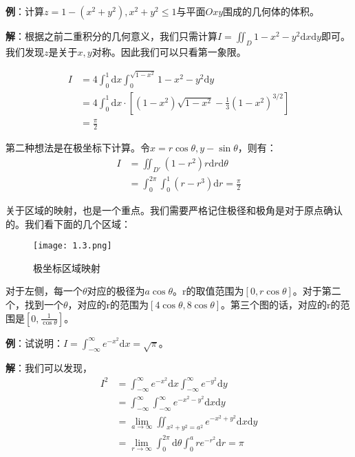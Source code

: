 \documentclass{ctexart}
\let\oldtextbf\textbf
\renewcommand{\textbf}[1]{\textcolor{brown!50!red}{\oldtextbf{#1}}}
\begin{document}
\textbf{\color{brown!50!red}例}：计算$z=1-(x^2+y^2),x^2+y^2\leq 1$与平面$Oxy$围成的几何体的体积。

\textbf{\color{brown!50!red}解}：根据之前二重积分的几何意义，我们只需计算$I=\iint_D 1-x^2-y^2 \mathrm{d}x\mathrm{d}y$即可。我们发现$z$是关于$x,y$对称。因此我们可以只看第一象限。

\begin{align*}
    I&=4\int_0^1\mathrm{d}x\int_0^{\sqrt{1-x^2}}1-x^2-y^2\mathrm{d}y \\
&=4\int_0^1\mathrm{d}x\cdot[(1-x^2)\sqrt{1-x^2}-\frac{1}{3} (1-x^2)^{3/2} ]\\
&=\frac{\pi}{2} 
\end{align*}

第二种想法是在极坐标下计算。令$x=r\cos\theta,y-\sin\theta$，则有：
\begin{align*}
    I&=\iint_{D'}(1-r^2)r\mathrm{d}r\mathrm{d}\theta\\
&=\int_0^{2\pi}\int_0^1(r-r^3)\mathrm{d}r=\frac{\pi}{2}  
\end{align*}

关于区域的映射，也是一个重点。我们需要严格记住极径和极角是对于原点确认的。我们看下面的几个区域：

\begin{figure}[H]    
\centering     
\renewcommand{\figurename}{图}     
\renewcommand{\thefigure}{1.3}    
\begin{myimagebox}[width=0.86\textwidth] %
\texttt{[image: 1.3.png]} %
\end{myimagebox}     
\caption{\label{fig:1.3}极坐标区域映射}   
\end{figure}

对于左侧，每一个$\theta$对应的极径为$a\cos\theta$。r的取值范围为$[0,r\cos\theta]$。对于第二个，找到一个$\theta$，对应的r的范围为$[4\cos\theta,8\cos\theta]$。第三个图的话，对应的r的范围是$[0,\frac{1}{\cos\theta}]$。

\textbf{\color{brown!50!red}例}：试说明：$I=\int_{-\infty}^{\infty} e^{-x^2}\mathrm{d}x=\sqrt{\pi}$。

\textbf{\color{brown!50!red}解}：我们可以发现，
\begin{align*}
    I^2&=\int_{-\infty}^{\infty} e^{-x^2}\mathrm{d}x\int_{-\infty}^{\infty} e^{-y^2}\mathrm{d}y\\
&=\int_{-\infty}^{\infty}\int_{-\infty}^\infty e^{-x^2-y^2}\mathrm{d}x\mathrm{d}y\\
&=\lim_{a\to\infty}\iint_{x^2+y^2=a^2} e^{-x^2+y^2}\mathrm{d}x\mathrm{d}y\\
&=\lim_{r\to\infty}\int_0^{2\pi}\mathrm{d}\theta\int_0^are^{-r^2}\mathrm{d}r=\pi 
\end{align*}
\end{document}
